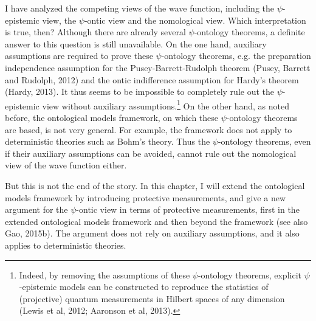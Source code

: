 
I have analyzed the competing views of the wave function, including the $\psi$-epistemic view, the $\psi$-ontic view and the nomological view. 
Which interpretation is true, then? 
Although there are already several $\psi$-ontology theorems, a definite  answer to this question is still unavailable.
On the one hand, auxiliary assumptions are  required to prove these $\psi$-ontology theorems, e.g. the preparation independence assumption for the Pusey-Barrett-Rudolph theorem (Pusey, Barrett and Rudolph, 2012) and the ontic indifference assumption for Hardy's theorem (Hardy, 2013). It thus seems to be impossible to completely rule out the $\psi$-epistemic view without auxiliary assumptions.\footnote{Indeed, by removing the assumptions of these $\psi$-ontology theorems, explicit $\psi$-epistemic models can be constructed to reproduce the statistics of (projective) quantum measurements in Hilbert spaces of any dimension (Lewis et al, 2012; Aaronson et al, 2013).}
On the other hand, as noted before, the ontological models framework, on which these $\psi$-ontology theorems are based, is not very general. For example, the framework does not apply to deterministic theories such as Bohm's theory. Thus the $\psi$-ontology theorems, even if their  auxiliary assumptions can be avoided, cannot rule out the nomological view of the wave function either. 

But this is not the end of the story. 
In this chapter, I will extend the ontological models framework by introducing protective measurements, and give a new argument for the $\psi$-ontic view in terms of protective measurements, first in the extended ontological models framework and then beyond the framework (see also Gao, 2015b). 
The argument does not rely on auxiliary assumptions, and it also applies to deterministic theories.

